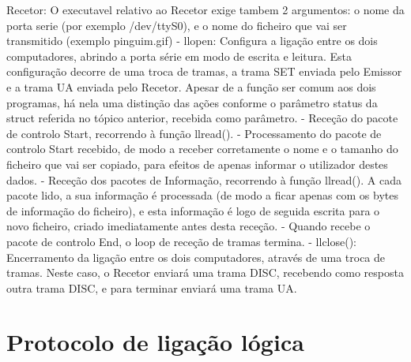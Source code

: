 \documentclass[article, a4paper, 11pt, oneside]{memoir}
\begin{document}
 Recetor:
 O executavel relativo ao Recetor exige tambem 2 argumentos: o nome da porta serie (por exemplo /dev/ttyS0), e o nome do ficheiro que vai ser transmitido (exemplo pinguim.gif)
 - llopen: Configura a ligação entre os dois computadores, abrindo a porta série em modo de escrita e leitura. Esta configuração decorre de uma troca de tramas, a trama SET enviada pelo Emissor e a trama UA enviada pelo Recetor. Apesar de a função ser comum aos dois programas, há nela uma distinção das ações conforme o parâmetro status da struct referida no tópico anterior, recebida como parâmetro.
- Receção do pacote de controlo Start, recorrendo à função llread().
- Processamento do pacote de controlo Start recebido, de modo a receber corretamente o nome e o tamanho do ficheiro que vai ser copiado, para efeitos de apenas informar o utilizador destes dados.
 - Receção dos pacotes de Informação, recorrendo à função llread(). A cada pacote lido, a sua informação é processada (de modo a ficar apenas com os bytes de informação do ficheiro), e esta informação é logo de seguida escrita para o novo ficheiro, criado imediatamente antes desta receção.
 - Quando recebe o pacote de controlo End, o loop de receção de tramas termina.
 - llclose(): Encerramento da ligação entre os dois computadores, através de uma troca de tramas. Neste caso, o Recetor enviará uma trama DISC, recebendo como resposta outra trama DISC, e para terminar enviará uma trama UA.


\newpage
\chapter[Protocolo de ligação lógica][Protocolo de ligação lógica]{Protocolo de ligação lógica} \label{\thechapter}
\end{document}
